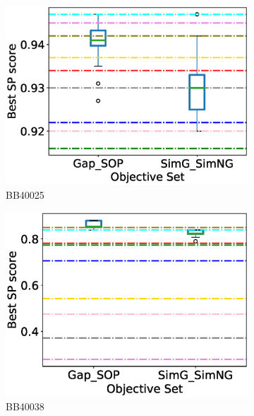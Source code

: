 \begin{figure}[!htbp]
\begin{adjustwidth}{-1cm}{-1cm}
\begin{subfigure}{0.22\textwidth}
			\includegraphics[width=\columnwidth]{Figure/summary/precomputedInit/Balibase/BB40025_objset_pairs_rank_2}
			\caption{BB40025}
		\end{subfigure}
		\begin{subfigure}{0.22\textwidth}
			\includegraphics[width=\columnwidth]{Figure/summary/precomputedInit/Balibase/BB40038_objset_pairs_rank_2}
			\caption{BB40038}
		\end{subfigure}
		\begin{subfigure}{0.22\textwidth}

\end{subfigure}
\end{adjustwidth}
\end{figure}
